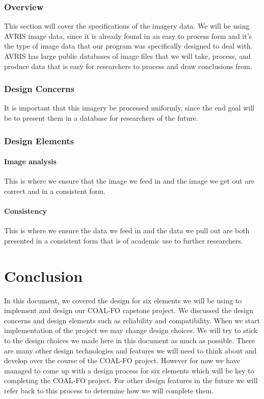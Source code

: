 \documentclass[10pt,draftclsnofoot,onecolumn,journal,compsoc]{IEEEtran}
\begin{document}
\subsubsection{Overview}
This section will cover the specifications of the imagery data. We will be using AVRIS image data, since it is already found in an easy to process form and it’s the type of image data that our program was specifically designed to deal with. AVRIS has large public databases of image files that we will take, process, and produce data that is easy for researchers to process and draw conclusions from.
\subsubsection{Design Concerns}
It is important that this imagery be processed uniformly, since the end goal will be to present them in a database for researchers of the future.
\subsubsection{Design Elements}
\paragraph{Image analysis}
This is where we ensure that the image we feed in and the image we get out are correct and in a consistent form.
\paragraph{Consistency}
This is where we ensure the data we feed in and the data we pull out are both presented in a consistent form that is of academic use to further researchers.

\section{Conclusion}

\noindent In this document, we covered the design for six elements we will be using to implement and design our COAL-FO capstone project. We discussed the design concerns and design elements such as reliability and compatibility. When we start implementation of the project we may change design choices. We will try to stick to the design choices we made here in this document as much as possible. There are many other design technologies and features we will need to think about and develop over the course of the COAL-FO project. However for now we have managed to come up with a design process for six elements which will be key to completing the COAL-FO project. For other design features in the future we will refer back to this process to determine how we will complete them.
\end{document}
